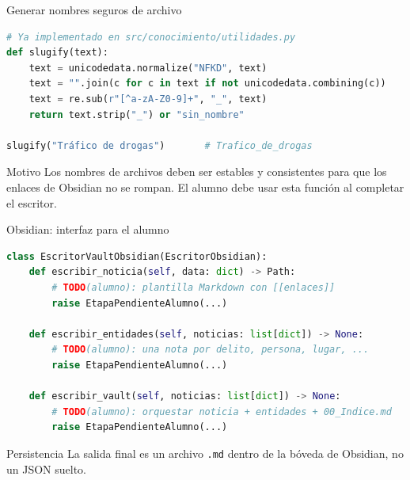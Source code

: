 \documentclass[11pt,aspectratio=169]{beamer}
\newcommand{\code}[1]{\texttt{#1}}
\begin{document}
\begin{frame}[fragile]{Generar nombres seguros de archivo}
\tiny
\begin{lstlisting}[language=Python]
# Ya implementado en src/conocimiento/utilidades.py
def slugify(text):
    text = unicodedata.normalize("NFKD", text)
    text = "".join(c for c in text if not unicodedata.combining(c))
    text = re.sub(r"[^a-zA-Z0-9]+", "_", text)
    return text.strip("_") or "sin_nombre"

slugify("Tráfico de drogas")       # Trafico_de_drogas
\end{lstlisting}

\scriptsize
\begin{block}{Motivo}
Los nombres de archivos deben ser estables y consistentes para que los enlaces de Obsidian no se rompan. El alumno debe usar esta función al completar el escritor.
\end{block}
\end{frame}

\begin{frame}[fragile]{Obsidian: interfaz para el alumno}
\tiny
\begin{lstlisting}[language=Python]
class EscritorVaultObsidian(EscritorObsidian):
    def escribir_noticia(self, data: dict) -> Path:
        # TODO(alumno): plantilla Markdown con [[enlaces]]
        raise EtapaPendienteAlumno(...)

    def escribir_entidades(self, noticias: list[dict]) -> None:
        # TODO(alumno): una nota por delito, persona, lugar, ...
        raise EtapaPendienteAlumno(...)

    def escribir_vault(self, noticias: list[dict]) -> None:
        # TODO(alumno): orquestar noticia + entidades + 00_Indice.md
        raise EtapaPendienteAlumno(...)
\end{lstlisting}

\scriptsize
\begin{alertblock}{Persistencia}
La salida final es un archivo \code{.md} dentro de la bóveda de Obsidian, no un JSON suelto.
\end{alertblock}
\end{frame}
\end{document}

